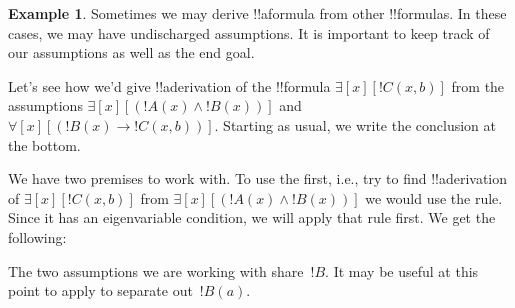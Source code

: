 \documentclass[10pt,a4paper]{article}
\theoremstyle{plain}
\theoremstyle{definition}
\newtheorem{ex}[thm]{Example}
\theoremstyle{remark}
\providecommand{\AxiomC}[1]{}
\providecommand{\UnaryInfC}[1]{}
\providecommand{\BinaryInfC}[1]{}
\providecommand{\RightLabel}[1]{}
\newenvironment{prooftree}{}{}
\providecommand{\lif}{\mathbin{\rightarrow}}
\providecommand{\lforall}{\mathord{\forall}}
\providecommand{\lexists}{\mathord{\exists}}
\providecommand{\Elim}[1]{}
\providecommand{\Discharge}{\mathrm{Dis}}
\begin{document}
\begin{ex}
Sometimes we may derive !!a{formula} from other !!{formula}s.
In these cases, we may have undischarged assumptions. It is 
important to keep track of our assumptions as well
as the end goal.

Let's see how we'd give !!a{derivation} of the !!{formula}
$\lexists[x][!C(x,b)]$ from the assumptions $\lexists[x][(!A(x) 
\land !B(x))]$ and $\lforall[x][(!B(x) \lif !C(x,b))]$.
Starting as usual, we write the conclusion at the
bottom.
\begin{prooftree}
\AxiomC{}
\UnaryInfC{$\lexists[x][!C(x,b)]$}
\end{prooftree}

We have two premises to work with. To use the first, i.e., try to find
!!a{derivation} of $\lexists[x][!C(x, b)]$ from $\lexists[x][(!A(x)
  \land !B(x))]$ we would use the \Elim{\lexists} rule. Since it has
an eigenvariable condition, we will apply that rule first. We get the
following:
\begin{prooftree}
\AxiomC{$\lexists[x][(!A(x) \land !B(x))]$}
\AxiomC{$\Discharge{!A(a) \land !B(a)}{1}$}
\DeduceC{$\lexists[x][!C(x,b)]$}
\DischargeRule{\Elim{\lexists}}{1}
\BinaryInfC{$\lexists[x][!C(x,b)]$}
\end{prooftree}
The two assumptions we are working with share~$!B$.  It may be useful
at this point to apply \Elim{\land} to separate out~$!B(a)$.
\begin{prooftree}
\AxiomC{$\lexists[x][(!A(x) \land !B(x)])$}
\AxiomC{$\Discharge{!A(a) 
\land !B(a)}{1}$}
\RightLabel{\Elim{\land}}
\UnaryInfC{$!B(a)$}
\DeduceC{$\lexists[x][!C(x,b)]$}
\DischargeRule{\Elim{\lexists}}{1}
\BinaryInfC{$\lexists[x][!C(x,b)]$}
\end{prooftree}


\end{ex}
\end{document}
